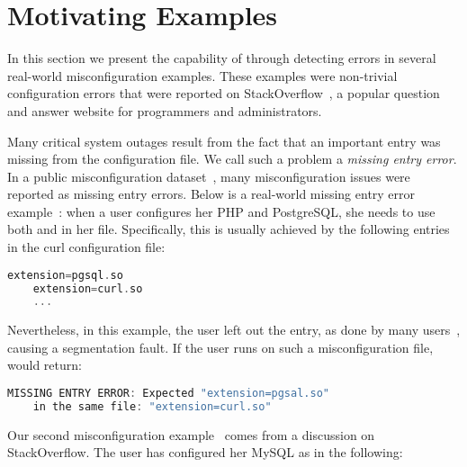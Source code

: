 \section{Motivating Examples}
\label{sec:motiv}

In this section we present the capability of \app through 
detecting errors in several real-world misconfiguration examples. 
These examples were non-trivial configuration errors
that were reported on StackOverflow~\cite{stackoverflow},
a popular question and answer website for programmers and administrators. 

Many critical system outages result from the fact that an important
entry was missing from the configuration file. 
We call such a problem a {\em missing entry error}.
In a public misconfiguration 
dataset~\cite{configdataset}, many misconfiguration issues were 
reported as missing entry errors.
Below is a real-world missing entry error example~\cite{missingentry}:
when a user configures her PHP and PostgreSQL,
she needs to use both  and 
in her  file.
Specifically, this is usually
achieved by the following entries in 
the curl configuration file:

\begin{lstlisting}[language=C, xleftmargin=.01\textwidth]
    extension=pgsql.so
    extension=curl.so
    ...
\end{lstlisting} 

Nevertheless, in this example, the user 
left out the  entry, 
as done by many users~\cite{yin11anempirical, missingentry}, 
causing a segmentation fault. 
If the user runs \app on such a misconfiguration file,
\app would return:

\begin{lstlisting}[language=C, xleftmargin=.01\textwidth]
    MISSING ENTRY ERROR: Expected "extension=pgsal.so"
    in the same file: "extension=curl.so"
\end{lstlisting} 

\label{ex:fine}
Our second misconfiguration example~\cite{correlation} 
comes from a discussion on StackOverflow.
The user has configured her MySQL as in the following:

